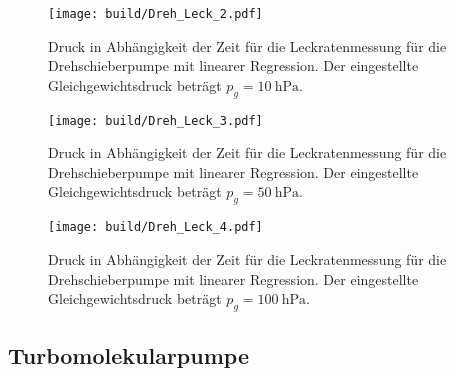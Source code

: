 \begin{figure}
    \centering
    \texttt{[image: build/Dreh\_Leck\_2.pdf]}
    \caption{Druck in Abhängigkeit der Zeit für die Leckratenmessung für die Drehschieberpumpe mit linearer Regression. Der eingestellte Gleichgewichtsdruck beträgt $p_g=\SI{10}{\hecto\pascal}$.}
    \label{fig:dreh_leck2}
\end{figure}

\begin{figure}
    \centering
    \texttt{[image: build/Dreh\_Leck\_3.pdf]}
    \caption{Druck in Abhängigkeit der Zeit für die Leckratenmessung für die Drehschieberpumpe mit linearer Regression. Der eingestellte Gleichgewichtsdruck beträgt $p_g=\SI{50}{\hecto\pascal}$.}
    \label{fig:dreh_leck3}
\end{figure}

\begin{figure}
    \centering
    \texttt{[image: build/Dreh\_Leck\_4.pdf]}
    \caption{Druck in Abhängigkeit der Zeit für die Leckratenmessung für die Drehschieberpumpe mit linearer Regression. Der eingestellte Gleichgewichtsdruck beträgt $p_g=\SI{100}{\hecto\pascal}$.}
    \label{fig:dreh_leck4}
\end{figure}
\noindent
\subsection{Turbomolekularpumpe}
